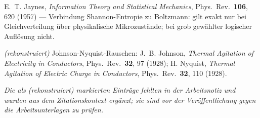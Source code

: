 \begin{description}[leftmargin=3.2em,style=sameline,itemsep=0.3em]
\item[{[B19]}] E.~T. Jaynes, \emph{Information Theory and Statistical Mechanics},
Phys.\ Rev.\ \textbf{106}, 620 (1957) --- Verbindung Shannon-Entropie zu
Boltzmann: gilt exakt nur bei Gleichverteilung über physikalische Mikrozustände;
bei grob gewählter logischer Auflösung nicht.

\item[{[B20]}] \emph{(rekonstruiert)} Johnson-Nyquist-Rauschen: J.~B. Johnson,
\emph{Thermal Agitation of Electricity in Conductors}, Phys.\ Rev.\ \textbf{32},
97 (1928); H. Nyquist, \emph{Thermal Agitation of Electric Charge in Conductors},
Phys.\ Rev.\ \textbf{32}, 110 (1928).

\end{description}
\endgroup

\vspace{1em}
\noindent
{\small\itshape Die als \emph{(rekonstruiert)} markierten Einträge fehlten in der
Arbeitsnotiz und wurden aus dem Zitationskontext ergänzt; sie sind vor der
Veröffentlichung gegen die Arbeitsunterlagen zu prüfen.}
